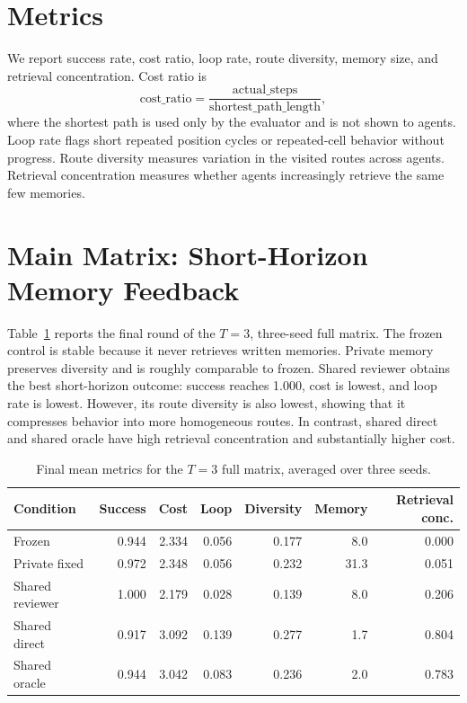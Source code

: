 \documentclass[11pt]{article}
\begin{document}
\section{Metrics}

We report success rate, cost ratio, loop rate, route diversity, memory size, and retrieval concentration. Cost ratio is
\[
    \mathrm{cost\_ratio} = \frac{\mathrm{actual\_steps}}{\mathrm{shortest\_path\_length}},
\]
where the shortest path is used only by the evaluator and is not shown to agents. Loop rate flags short repeated position cycles or repeated-cell behavior without progress. Route diversity measures variation in the visited routes across agents. Retrieval concentration measures whether agents increasingly retrieve the same few memories.

\section{Main Matrix: Short-Horizon Memory Feedback}

Table~\ref{tab:full-matrix} reports the final round of the $T=3$, three-seed full matrix. The frozen control is stable because it never retrieves written memories. Private memory preserves diversity and is roughly comparable to frozen. Shared reviewer obtains the best short-horizon outcome: success reaches 1.000, cost is lowest, and loop rate is lowest. However, its route diversity is also lowest, showing that it compresses behavior into more homogeneous routes. In contrast, shared direct and shared oracle have high retrieval concentration and substantially higher cost.

\begin{table}[h]
\centering
\caption{Final mean metrics for the $T=3$ full matrix, averaged over three seeds.}
\label{tab:full-matrix}
\begin{tabular}{lrrrrrr}
\toprule
Condition & Success & Cost & Loop & Diversity & Memory & Retrieval conc. \\
\midrule
Frozen          & 0.944 & 2.334 & 0.056 & 0.177 & 8.0  & 0.000 \\
Private fixed   & 0.972 & 2.348 & 0.056 & 0.232 & 31.3 & 0.051 \\
Shared reviewer & 1.000 & 2.179 & 0.028 & 0.139 & 8.0  & 0.206 \\
Shared direct   & 0.917 & 3.092 & 0.139 & 0.277 & 1.7  & 0.804 \\
Shared oracle   & 0.944 & 3.042 & 0.083 & 0.236 & 2.0  & 0.783 \\
\bottomrule
\end{tabular}
\end{table}
\end{document}
